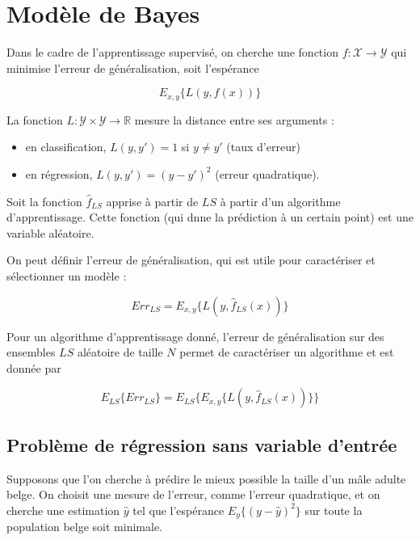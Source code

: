 \chapter{Modèle de Bayes}

Dans le cadre de l'apprentissage supervisé, on cherche une fonction $f : \mathcal{X} \rightarrow \mathcal{Y}$ qui minimise l'erreur de généralisation, soit l'espérance

$$E_{x, y} \{L(y, f(x))\}$$

La fonction $L : \mathcal{Y} \times \mathcal{Y} \rightarrow \mathbb{R}$ mesure la distance entre ses arguments :

\begin{itemize}
	\item en classification, $L(y, y') = 1$ si $y \neq y'$ (taux d'erreur)
	\item en régression, $L(y, y') = (y - y')^2$ (erreur quadratique).
\end{itemize}

Soit la fonction $\hat{f}_{LS}$ apprise à partir de $LS$ à partir d'un algorithme d'apprentissage. Cette fonction (qui dnne la prédiction à un certain point) est une variable aléatoire.


On peut définir l'erreur de généralisation, qui est utile pour caractériser et sélectionner un modèle :

$$Err_{LS} = E_{x, y} \{L(y, \hat{f}_{LS}(x))\}$$

Pour un algorithme d'apprentissage donné, l'erreur de généralisation sur des ensembles $LS$ aléatoire de taille $N$ permet de caractériser un algorithme et est donnée par

$$E_{LS}\{Err_{LS}\} = E_{LS}\{E_{x, y} \{L(y, \hat{f}_{LS}(x))\} \}$$

	\section{Problème de régression sans variable d'entrée}
	
	Supposons que l'on cherche à prédire le mieux possible la taille d'un mâle adulte belge. On choisit une mesure de l'erreur, comme l'erreur quadratique, et on cherche une estimation $\hat{y}$ tel que l'espérance $E_y\{(y - \hat{y})^2\}$ sur toute la population belge soit minimale.
	
	\newcommand{\ey}[1]{E_y\{#1\}}
	\newcommand{\els}[1]{E_{LS}\{#1\}}
	\newcommand{\yh}{\hat{y}}
	\newcommand{\vary}[1]{var_y\{#1\}}
	\newcommand{\varyx}[1]{var_{y\vert \underline{x}}\{#1\}}
	\newcommand{\varls}[1]{var_{LS}\{#1\}}
	
